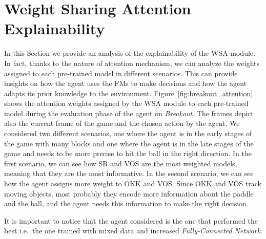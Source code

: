 \section{Weight Sharing Attention Explainability}\label{sec:explainability}


In this Section we provide an analysis of the explainability of the WSA module.
In fact, thanks to the nature of attention mechanism, we can analyze the weights assigned to each pre-trained model in different scenarios.
This can provide insights on how the agent uses the FMs to make decisions and how the agent adapts its prior knowledge to the environment.
Figure~\ref{fig:breakout_attention} shows the attention weights assigned by the WSA module to each pre-trained model during the evaluation phase of the agent on \textit{Breakout}.
The frames depict also the current frame of the game and the chosen action by the agent.
We considered two different scenarios, one where the agent is in the early stages of the game with many blocks and one where the agent is in the late stages of the game and needs to be more precise to hit the ball in the right direction.
In the first scenario, we can see how SR and VOS are the most weighted models, meaning that they are the most informative.
In the second scenario, we can see how the agent assigns more weight to OKK and VOS.
Since OKK and VOS track moving objects, most probably they encode more information about the paddle and the ball, and the agent needs this information to make the right decision.

It is important to notice that the agent considered is the one that performed the best i.e.\ the one trained with mixed data and increased \textit{Fully-Connected Network}.


